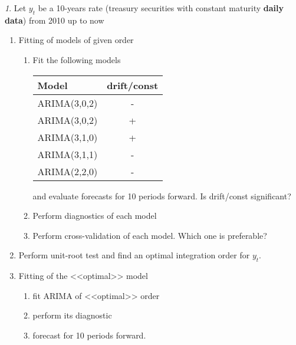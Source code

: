 \documentclass[12pt]{article}
\theoremstyle{remark}
\newtheorem{exercise}{}[section]
\begin{document}
\begin{exercise}
Let \(y_t\) be a 10-years rate (treasury securities  with constant maturity  \textbf{daily data}) from 2010 up to now
\begin{enumerate}
	\item Fitting of models of given order
	\begin{enumerate}
		\item Fit the following models
		\begin{center}\small
			\begin{tabular}{l|c}
				Model & drift/const \\ \hline
				ARIMA(3,0,2) & - \\
				ARIMA(3,0,2) & + \\
				ARIMA(3,1,0) & + \\
				ARIMA(3,1,1) & - \\
				ARIMA(2,2,0) & - \\ \hline
			\end{tabular}
		\end{center} 
		and evaluate forecasts for 10 periods forward. Is drift/const significant?
		\item Perform diagnostics of each model
		\item Perform cross-validation of each model. Which one is preferable?
	\end{enumerate}
	\item Perform unit-root test and find an optimal integration order for  \(y_t\). 
	\item Fitting of the <<optimal>> model
	\begin{enumerate}
		\item fit ARIMA of <<optimal>> order
		\item perform its diagnostic
		\item forecast for 10 periods forward.
	\end{enumerate}
\end{enumerate}
\end{exercise}
\end{document}
